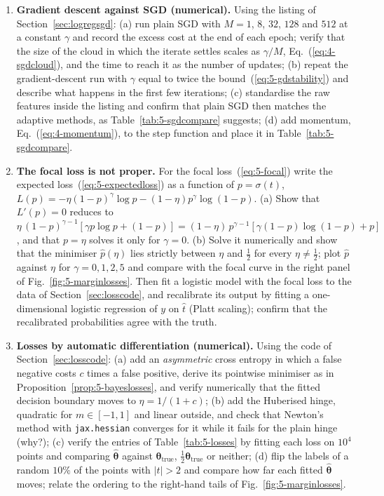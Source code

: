 \begin{enumerate}
\item \textbf{Gradient descent against SGD (numerical).}
  Using the listing of Section~\ref{sec:logregsgd}:
  (a) run plain SGD with $M=1$, $8$, $32$, $128$ and $512$ at a constant
      $\gamma$ and record the excess cost at the end of each epoch; verify
      that the size of the cloud in which the iterate settles scales as
      $\gamma/M$, Eq.~(\ref{eq:4-sgdcloud}), and the time to reach it as
      the number of updates;
  (b) repeat the gradient-descent run with $\gamma$ equal to twice the
      bound~(\ref{eq:5-gdstability}) and describe what happens in the
      first few iterations;
  (c) standardise the raw features inside the listing and confirm that
      plain SGD then matches the adaptive methods, as
      Table~\ref{tab:5-sgdcompare} suggests;
  (d) add momentum, Eq.~(\ref{eq:4-momentum}), to the step function and
      place it in Table~\ref{tab:5-sgdcompare}.

\item \textbf{The focal loss is not proper.}
  For the focal loss~(\ref{eq:5-focal}) write the expected
  loss~(\ref{eq:5-expectedloss}) as a function of $p=\sigma(t)$,
  $L(p)=-\eta(1-p)^{\gamma}\log p-(1-\eta)p^{\gamma}\log(1-p)$.
  (a) Show that $L'(p)=0$ reduces to
      $\eta\,(1-p)^{\gamma-1}\left[\gamma p\log p+(1-p)\right]
       =(1-\eta)\,p^{\gamma-1}\left[\gamma(1-p)\log(1-p)+p\right]$,
      and that $p=\eta$ solves it only for $\gamma=0$.
  (b) Solve it numerically and show that the minimiser $\hat p(\eta)$ lies
      strictly between $\eta$ and $\tfrac12$ for every $\eta\neq\tfrac12$;
      plot $\hat p$ against $\eta$ for $\gamma=0,1,2,5$ and compare with the
      focal curve in the right panel of Fig.~\ref{fig:5-marginlosses}.  Then fit a logistic model with the focal loss to the data
  of Section~\ref{sec:losscode}, and recalibrate its output by fitting a
  one-dimensional logistic regression of $y$ on $\hat t$ (Platt scaling);
  confirm that the recalibrated probabilities agree with the truth.

\item \textbf{Losses by automatic differentiation (numerical).}
  Using the code of Section~\ref{sec:losscode}:
  (a) add an \emph{asymmetric} cross entropy in which a false negative costs
      $c$ times a false positive, derive its pointwise minimiser as in
      Proposition~\ref{prop:5-bayeslosses}, and verify numerically that the
      fitted decision boundary moves to $\eta=1/(1+c)$;
  (b) add the Huberised hinge, quadratic for $m\in[-1,1]$ and linear
      outside, and check that Newton's method with \texttt{jax.hessian}
      converges for it while it fails for the plain hinge (why?);
  (c) verify the entries of Table~\ref{tab:5-losses} by fitting each loss on
      $10^{4}$ points and comparing $\hat{\bm{\theta}}$ against
      $\bm{\theta}_{\mathrm{true}}$, $\tfrac12\bm{\theta}_{\mathrm{true}}$
      or neither;
  (d) flip the labels of a random $10\%$ of the points with $|t|>2$ and
      compare how far each fitted $\hat{\bm{\theta}}$ moves; relate the
      ordering to the right-hand tails of Fig.~\ref{fig:5-marginlosses}.


\end{enumerate}

